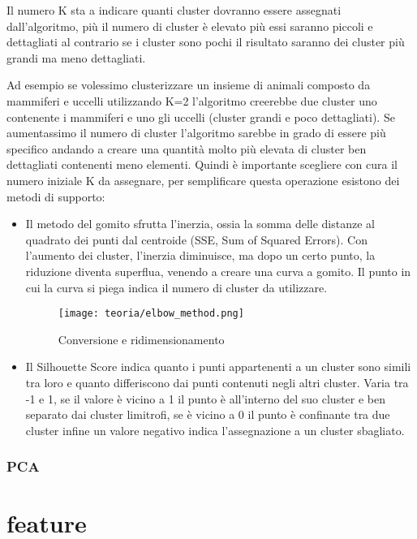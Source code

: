 Il numero K sta a indicare quanti cluster dovranno essere assegnati dall'algoritmo, più il numero di cluster è elevato più essi saranno piccoli e dettagliati al contrario se i cluster sono pochi il risultato saranno dei cluster più grandi ma meno dettagliati.

Ad esempio se volessimo clusterizzare un insieme di animali composto da mammiferi e uccelli utilizzando K=2 l'algoritmo creerebbe due cluster uno contenente i mammiferi e uno gli uccelli (cluster grandi e poco dettagliati).
Se aumentassimo il numero di cluster l'algoritmo sarebbe in grado di essere più specifico andando a creare una quantità molto più elevata di cluster ben dettagliati contenenti meno elementi.
Quindi è importante scegliere con cura il numero iniziale K da assegnare, per semplificare questa operazione esistono dei metodi di supporto:
\begin{itemize}
    \item Il metodo del gomito sfrutta l’inerzia, ossia la somma delle distanze al quadrato dei punti dal centroide (SSE, Sum of Squared Errors). Con l'aumento dei cluster, l’inerzia diminuisce, ma dopo un certo punto, la riduzione diventa superflua, venendo a creare una curva a gomito. Il punto in cui la curva si piega indica il numero di cluster da utilizzare.
    
    \begin{figure}[!h] 
        \centering 
        \texttt{[image: teoria/elbow\_method.png]} 
        \caption{Conversione e ridimensionamento}
        \label{fig:gomito}
      \end{figure}

    \item Il Silhouette Score indica quanto i punti appartenenti a un cluster sono simili tra loro e quanto differiscono dai punti contenuti negli altri cluster.
    Varia tra -1 e 1, se il valore è vicino a 1 il punto è all'interno del suo cluster e ben separato dai cluster limitrofi, se è vicino a 0 il punto è confinante tra due cluster infine un valore negativo indica l'assegnazione a un cluster sbagliato.
\end{itemize}


\subsubsection{PCA}
\section{feature}



